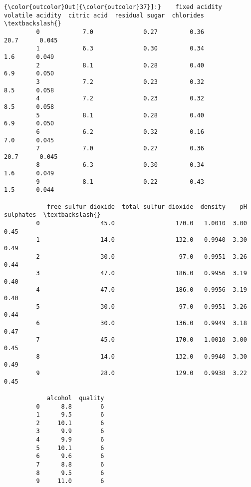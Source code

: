 \documentclass[11pt]{article}
\begin{document}
\begin{Verbatim}[commandchars=\\\{\}]
{\color{outcolor}Out[{\color{outcolor}37}]:}    fixed acidity  volatile acidity  citric acid  residual sugar  chlorides  \textbackslash{}
         0            7.0              0.27         0.36            20.7      0.045   
         1            6.3              0.30         0.34             1.6      0.049   
         2            8.1              0.28         0.40             6.9      0.050   
         3            7.2              0.23         0.32             8.5      0.058   
         4            7.2              0.23         0.32             8.5      0.058   
         5            8.1              0.28         0.40             6.9      0.050   
         6            6.2              0.32         0.16             7.0      0.045   
         7            7.0              0.27         0.36            20.7      0.045   
         8            6.3              0.30         0.34             1.6      0.049   
         9            8.1              0.22         0.43             1.5      0.044   
         
            free sulfur dioxide  total sulfur dioxide  density    pH  sulphates  \textbackslash{}
         0                 45.0                 170.0   1.0010  3.00       0.45   
         1                 14.0                 132.0   0.9940  3.30       0.49   
         2                 30.0                  97.0   0.9951  3.26       0.44   
         3                 47.0                 186.0   0.9956  3.19       0.40   
         4                 47.0                 186.0   0.9956  3.19       0.40   
         5                 30.0                  97.0   0.9951  3.26       0.44   
         6                 30.0                 136.0   0.9949  3.18       0.47   
         7                 45.0                 170.0   1.0010  3.00       0.45   
         8                 14.0                 132.0   0.9940  3.30       0.49   
         9                 28.0                 129.0   0.9938  3.22       0.45   
         
            alcohol  quality  
         0      8.8        6  
         1      9.5        6  
         2     10.1        6  
         3      9.9        6  
         4      9.9        6  
         5     10.1        6  
         6      9.6        6  
         7      8.8        6  
         8      9.5        6  
         9     11.0        6  
\end{Verbatim}
            
\end{document}
